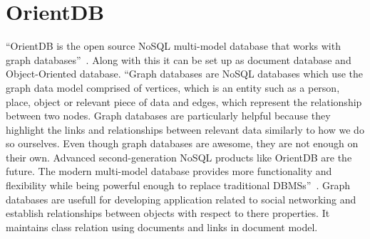 \section{OrientDB}

“OrientDB is the open source NoSQL multi-model database that works with graph 
databases”~\cite{hid-sp18-520-OrientDB}. Along with this it can be set up as 
document database and Object-Oriented database. 
“Graph databases are NoSQL databases which use the graph data model comprised 
of vertices, which is an entity such as a person, place, object or relevant 
piece of data and edges, which represent the relationship between two nodes.
Graph databases are particularly helpful because they highlight the links and
relationships between relevant data similarly to how we do so ourselves.
Even though graph databases are awesome, they are not enough on their own.
Advanced second-generation NoSQL products like OrientDB are the future. The 
modern multi-model database provides more functionality and flexibility while
being powerful enough to replace traditional 
DBMSs”~\cite{hid-sp18-520-OrientDB-graph}.
Graph databases are usefull for developing application related to social 
networking and establish relationships between objects with respect to there 
properties. It maintains class relation using documents and links in document 
model.
